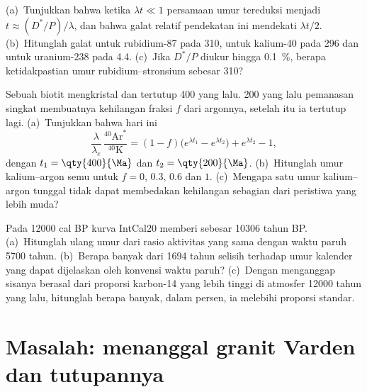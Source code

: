\begin{exercise}[$\star\star\star$]\label{exo:b1:radiometric-methods:10}
(a)~Tunjukkan bahwa ketika $\lambda t \ll 1$ persamaan umur tereduksi menjadi $t \approx
(D^*/P)/\lambda$, dan bahwa galat relatif pendekatan ini mendekati
$\lambda t/2$. (b)~Hitunglah galat untuk rubidium-87 pada \qty{310}{\Ma}, untuk
kalium-40 pada \qty{296}{\Ma} dan untuk uranium-238 pada \qty{4.4}{\Ga}. (c)~Jika
$D^*/P$ diukur hingga \qty{0.1}{\percent}, berapa ketidakpastian umur rubidium--stronsium
sebesar \qty{310}{\Ma}?
\end{exercise}

\begin{exercise}[$\star\star\star$]\label{exo:b1:radiometric-methods:11}
Sebuah biotit mengkristal dan tertutup \qty{400}{\Ma} yang lalu. \qty{200}{\Ma} yang lalu pemanasan singkat membuatnya kehilangan fraksi $f$ dari argonnya, setelah itu ia tertutup lagi. (a)~Tunjukkan bahwa hari ini
\[
  \frac{\lambda}{\lambda_e}\,\frac{^{40}\mathrm{Ar}^*}{^{40}\mathrm{K}} =
  (1 - f)\bigl(e^{\lambda t_1} - e^{\lambda t_2}\bigr) + e^{\lambda t_2} - 1,
\]
dengan $t_1 = \qty{400}{\Ma}$ dan $t_2 = \qty{200}{\Ma}$. (b)~Hitunglah umur kalium--argon semu untuk $f = 0$, $0.3$, $0.6$ dan $1$. (c)~Mengapa satu umur kalium--argon tunggal tidak dapat membedakan kehilangan sebagian dari peristiwa yang lebih muda?
\end{exercise}

\begin{exercise}[$\star\star\star$]\label{exo:b1:radiometric-methods:12}
Pada \num{12000} cal BP kurva IntCal20 memberi  sebesar \num{10306} tahun BP. (a)~Hitunglah ulang umur dari rasio aktivitas yang sama dengan waktu paruh \num{5700} tahun. (b)~Berapa banyak dari \num{1694} tahun selisih  terhadap umur kalender yang dapat dijelaskan oleh konvensi waktu paruh? (c)~Dengan menganggap sisanya berasal dari proporsi karbon-14 yang lebih tinggi di atmosfer \num{12000} tahun yang lalu, hitunglah berapa banyak, dalam persen, ia melebihi proporsi standar.
\end{exercise}

\section{Masalah: menanggal granit Varden dan tutupannya}

